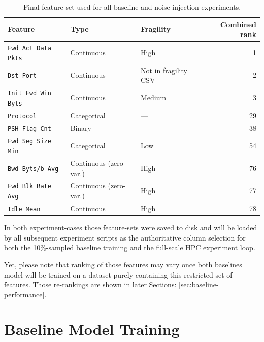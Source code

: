 \documentclass[../main.tex]{subfiles}
\begin{document}
\begin{itemize}
    \begin{table}[H]
    \centering
    \caption{Final feature set used for all baseline and noise-injection experiments.}
    \label{tab:final-features}
    \small
    \begin{tabular}{lllr}
    \toprule
    \textbf{Feature}          & \textbf{Type}      & \textbf{Fragility}  & \textbf{Combined rank} \\
    \midrule
    \texttt{Fwd Act Data Pkts}  & Continuous         & High                & 1   \\
    \texttt{Dst Port}           & Continuous         & Not in fragility CSV & 2  \\
    \texttt{Init Fwd Win Byts}  & Continuous         & Medium              & 3   \\
    \texttt{Protocol}           & Categorical        & —                   & 29  \\
    \texttt{PSH Flag Cnt}       & Binary             & —                   & 38  \\
    \texttt{Fwd Seg Size Min}   & Categorical        & Low                 & 54  \\
    \texttt{Bwd Byts/b Avg}     & Continuous (zero-var.) & High            & 76  \\
    \texttt{Fwd Blk Rate Avg}   & Continuous (zero-var.) & High            & 77  \\
    \texttt{Idle Mean}          & Continuous         & High                & 78  \\
    \bottomrule
    \end{tabular}
    \end{table}
    
\end{itemize}

In both experiment-cases those feature-sets were saved to disk and will be loaded by all subsequent experiment scripts as the authoritative column selection for both the 10\%-sampled baseline training and the full-scale HPC experiment loop.

Yet, please note that ranking of those features may vary once both baselines model will be trained on a dataset purely containing this restricted set of features. Those re-rankings are shown in later Sections: \ref{sec:baseline-performance}.



\newpage
\section{Baseline Model Training}
\label{sec:baseline-training}
\end{document}
